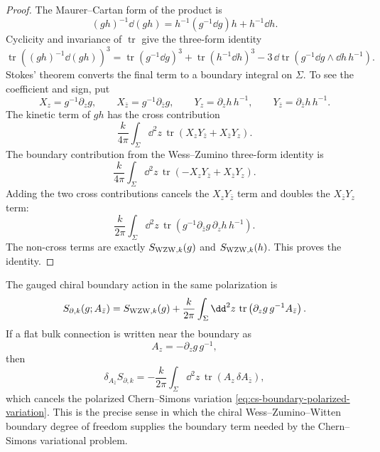 \begin{proof}
The Maurer--Cartan form of the product is
\[
  (gh)^{-1}\dd(gh)
  =
  h^{-1}(g^{-1}\dd g)h+h^{-1}\dd h .
\]
Cyclicity and invariance of \(\operatorname{tr}\) give the three-form
identity
\[
  \operatorname{tr}\!\left((gh)^{-1}\dd(gh)\right)^3
  =
  \operatorname{tr}(g^{-1}\dd g)^3
  +
  \operatorname{tr}(h^{-1}\dd h)^3
  -
  3\,\dd\operatorname{tr}
  \left(g^{-1}\dd g\wedge \dd h\,h^{-1}\right).
\]
Stokes' theorem converts the final term to a boundary integral on
\(\Sigma\).  To see the coefficient and sign, put
\[
  X_z=g^{-1}\partial_zg,\qquad
  X_{\bar z}=g^{-1}\partial_{\bar z}g,\qquad
  Y_z=\partial_zh\,h^{-1},\qquad
  Y_{\bar z}=\partial_{\bar z}h\,h^{-1}.
\]
The kinetic term of \(gh\) has the cross contribution
\[
  \frac{k}{4\pi}\int_\Sigma\dd^2z\,
  \operatorname{tr}(X_zY_{\bar z}+X_{\bar z}Y_z).
\]
The boundary contribution from the Wess--Zumino three-form identity is
\[
  \frac{k}{4\pi}\int_\Sigma\dd^2z\,
  \operatorname{tr}(-X_zY_{\bar z}+X_{\bar z}Y_z).
\]
Adding the two cross contributions cancels the \(X_zY_{\bar z}\) term and
doubles the \(X_{\bar z}Y_z\) term:
\[
  \frac{k}{2\pi}\int_\Sigma\dd^2z\,
  \operatorname{tr}(g^{-1}\partial_{\bar z}g\,\partial_zh\,h^{-1}).
\]
The non-cross terms are exactly \(S_{{\rm WZW},k}(g)\) and
\(S_{{\rm WZW},k}(h)\).  This proves the identity.
\end{proof}

The gauged chiral boundary action in the same polarization is
\begin{equation}
  S_{\partial,k}(g;A_{\bar z})
  =
  S_{{\rm WZW},k}(g)
  +
  \frac{k}{2\pi}\int_\Sigma\dd^2z\,
  \operatorname{tr}
  \left(\partial_zg\,g^{-1}A_{\bar z}\right).
  \label{eq:chiral-gauged-wzw-boundary-action}
\end{equation}
If a flat bulk connection is written near the boundary as
\[
  A_z=-\partial_zg\,g^{-1},
\]
then
\[
  \delta_{A_{\bar z}}S_{\partial,k}
  =
  -\frac{k}{2\pi}\int_\Sigma\dd^2z\,
  \operatorname{tr}(A_z\,\delta A_{\bar z}),
\]
which cancels the polarized Chern--Simons variation
\eqref{eq:cs-boundary-polarized-variation}.  This is the precise sense in
which the chiral Wess--Zumino--Witten boundary degree of freedom supplies the
boundary term needed by the Chern--Simons variational problem.

